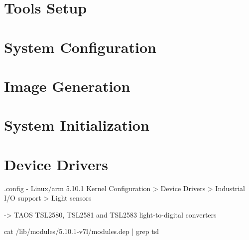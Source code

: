 \section{Tools Setup}


\clearpage
\section{System Configuration}


\clearpage
\section{Image Generation}


\section{System Initialization}


\clearpage
\section{Device Drivers}


.config - Linux/arm 5.10.1 Kernel Configuration
> Device Drivers > Industrial I/O support > Light sensors

-> TAOS TSL2580, TSL2581 and TSL2583 light-to-digital converters

cat /lib/modules/5.10.1-v7l/modules.dep | grep tsl